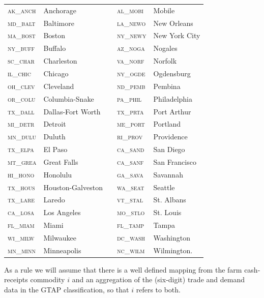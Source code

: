 \documentclass{ejb}
\begin{document}
\vspace{5pt}
\begin{tabular}{lllll}
\textsc{ak\_anch}&Anchorage&&		\textsc{al\_mobi}&Mobile	     \\
\textsc{md\_balt}&Baltimore&&		\textsc{la\_newo}&New Orleans	     \\
\textsc{ma\_bost}&Boston&&		\textsc{ny\_newy}&New York City	     \\
\textsc{ny\_buff}&Buffalo&&		\textsc{az\_noga}&Nogales	     \\
\textsc{sc\_char}&Charleston&&		\textsc{va\_norf}&Norfolk	     \\
\textsc{il\_chic}&Chicago&&		\textsc{ny\_ogde}&Ogdensburg	     \\
\textsc{oh\_clev}&Cleveland&&		\textsc{nd\_pemb}&Pembina	     \\
\textsc{or\_colu}&Columbia-Snake&&	\textsc{pa\_phil}&Philadelphia	     \\
\textsc{tx\_dall}&Dallas-Fort Worth&&	\textsc{tx\_prta}&Port Arthur	     \\
\textsc{mi\_detr}&Detroit&&		\textsc{me\_port}&Portland	     \\
\textsc{mn\_dulu}&Duluth&&		\textsc{ri\_prov}&Providence	     \\
\textsc{tx\_elpa}&El Paso&&		\textsc{ca\_sand}&San Diego	     \\
\textsc{mt\_grea}&Great Falls&&		\textsc{ca\_sanf}&San Francisco	     \\
\textsc{hi\_hono}&Honolulu&&		\textsc{ga\_sava}&Savannah	     \\
\textsc{tx\_hous}&Houston-Galveston&&	\textsc{wa\_seat}&Seattle	     \\
\textsc{tx\_lare}&Laredo&&		\textsc{vt\_stal}&St. Albans	     \\
\textsc{ca\_losa}&Los Angeles&&		\textsc{mo\_stlo}&St. Louis	     \\
\textsc{fl\_miam}&Miami&&		\textsc{fl\_tamp}&Tampa		     \\
\textsc{wi\_milw}&Milwaukee&&		\textsc{dc\_wash}&Washington		\\
\textsc{mn\_minn}&Minneapolis&&		\textsc{nc\_wilm}&Wilmington.        
\end{tabular}
\vspace{5pt}

\noindent As a rule we will assume that there is a well defined
mapping from the farm cash-receipts commodity $i$ and an aggregation
of the (six-digit) trade and demand data in the GTAP classification,
so that $i$ refers to both.  
\end{document}
